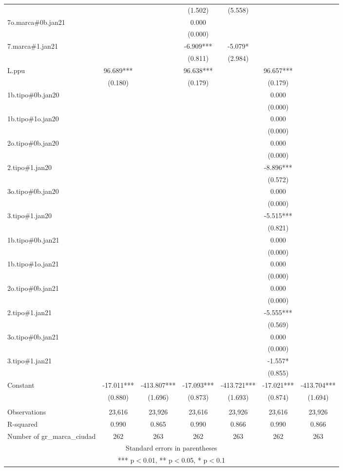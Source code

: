 \begin{tabular}{lcccccc}
 &  &  & (1.502) & (5.558) &  &  \\
7o.marca\#0b.jan21 &  &  & 0.000 &  &  &  \\
 &  &  & (0.000) &  &  &  \\
7.marca\#1.jan21 &  &  & -6.909*** & -5.079* &  &  \\
 &  &  & (0.811) & (2.984) &  &  \\
L.ppu & 96.689*** &  & 96.638*** &  & 96.657*** &  \\
 & (0.180) &  & (0.179) &  & (0.179) &  \\
1b.tipo\#0b.jan20 &  &  &  &  & 0.000 &  \\
 &  &  &  &  & (0.000) &  \\
1b.tipo\#1o.jan20 &  &  &  &  & 0.000 &  \\
 &  &  &  &  & (0.000) &  \\
2o.tipo\#0b.jan20 &  &  &  &  & 0.000 &  \\
 &  &  &  &  & (0.000) &  \\
2.tipo\#1.jan20 &  &  &  &  & -8.896*** &  \\
 &  &  &  &  & (0.572) &  \\
3o.tipo\#0b.jan20 &  &  &  &  & 0.000 &  \\
 &  &  &  &  & (0.000) &  \\
3.tipo\#1.jan20 &  &  &  &  & -5.515*** &  \\
 &  &  &  &  & (0.821) &  \\
1b.tipo\#0b.jan21 &  &  &  &  & 0.000 &  \\
 &  &  &  &  & (0.000) &  \\
1b.tipo\#1o.jan21 &  &  &  &  & 0.000 &  \\
 &  &  &  &  & (0.000) &  \\
2o.tipo\#0b.jan21 &  &  &  &  & 0.000 &  \\
 &  &  &  &  & (0.000) &  \\
2.tipo\#1.jan21 &  &  &  &  & -5.555*** &  \\
 &  &  &  &  & (0.569) &  \\
3o.tipo\#0b.jan21 &  &  &  &  & 0.000 &  \\
 &  &  &  &  & (0.000) &  \\
3.tipo\#1.jan21 &  &  &  &  & -1.557* &  \\
 &  &  &  &  & (0.855) &  \\
Constant & -17.011*** & -413.807*** & -17.093*** & -413.721*** & -17.021*** & -413.704*** \\
 & (0.880) & (1.696) & (0.873) & (1.693) & (0.874) & (1.694) \\
 &  &  &  &  &  &  \\
Observations & 23,616 & 23,926 & 23,616 & 23,926 & 23,616 & 23,926 \\
R-squared & 0.990 & 0.865 & 0.990 & 0.866 & 0.990 & 0.866 \\
 Number of gr\_marca\_ciudad & 262 & 263 & 262 & 263 & 262 & 263 \\ \hline
\multicolumn{7}{c}{ Standard errors in parentheses} \\
\multicolumn{7}{c}{ *** p$<$0.01, ** p$<$0.05, * p$<$0.1} \\
\end{tabular}
